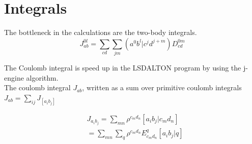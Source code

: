 \documentclass[12pt,a4paper,english]{beamer}
\begin{document}
\section{Integrals} \begin{frame} The bottleneck in the calculations are the
        two-body integrals. 
        \begin{equation}
                J_{ab}^{0l}=\sum_{cd}\sum_{jm}(a^0b^l|c^jd^{j+m})D_{cd}^{0m}
        \end{equation}

        The Coulomb integral is speed up in the LSDALTON program by using the 
        j-engine algorithm. \\
        \vspace{\baselineskip}
        The coulomb integral $J_{ab}$, written as a sum over primitive coulomb integrals
        $J_{ab}=\sum_{ij}J_{[a_ib_j]}$
                
        \begin{equation}
        \begin{split}
                &J_{a_ib_j}=\sum_{mn}\rho^{c_md_n}[a_ib_j|c_md_n]\\
                &=\sum_{mn}\sum_q\rho^{c_md_n}E^q_{c_md_n}[a_ib_j|q]\\
        \end{split}
        \end{equation}
\end{frame}
\end{document}
